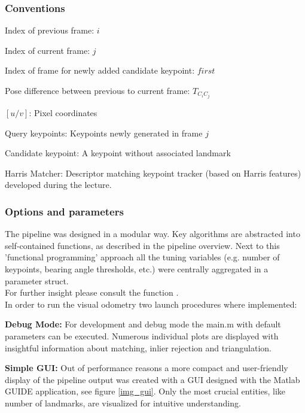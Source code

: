 \subsubsection{Conventions}
\begin{compactitem}
	\item Index of previous frame: $i$
	\item Index of current frame: $j$
	\item Index of frame for newly added candidate keypoint: $first$
	\item Pose difference between previous to current frame: $T_{C_iC_j}$
	\item $\left[u/v\right]$: Pixel coordinates
	\item Query keypoints: Keypoints newly generated in frame $j$ 
	\item Candidate keypoint: A keypoint without associated landmark
	\item Harris Matcher: Descriptor matching keypoint tracker (based on Harris features) developed during the lecture.
\end{compactitem}

\subsubsection{Options and parameters}
The pipeline was designed in a modular way. Key algorithms are abstracted into self-contained functions, as described in the pipeline overview. Next to this 'functional programming' approach all the tuning variables (e.g. number of keypoints, bearing angle thresholds, etc.) were centrally aggregated in a parameter struct.\\
For further insight please consult the function .\\

In order to run the visual odometry two launch procedures where implemented:
\begin{compactitem}
	\item \textbf{Debug Mode:} For development and debug mode the main.m with default 		parameters can be executed. Numerous individual plots are displayed with insightful 		information about matching, inlier rejection and triangulation.
	\item \textbf{Simple GUI:} Out of performance reasons a more compact and user-friendly display of the pipeline output was created with a GUI designed with the Matlab GUIDE application, see figure \cref{img_gui}. Only the most crucial entities, like number of landmarks, are visualized for intuitive understanding.\\
\end {compactitem}

